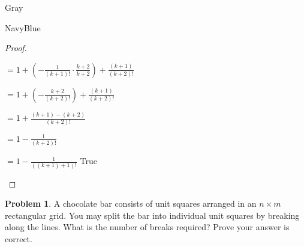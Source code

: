 \documentclass[12pt]{amsart}
\newcounter{problem_number}[section]
\theoremstyle{named}
\newenvironment{prf}
{\medskip\begin{color}{Gray}\begin{framed}\begin{color}{NavyBlue}\begin{proof}[Proof]
\doublespacing}
{\end{proof}\end{color}\end{framed}\end{color}\medskip}
\theoremstyle{definition}
\newtheorem{problem}[proposition]{Problem}
\begin{document}
\begin{prf}
\begin{adjustwidth}{2em}{0em}
		\vspace*{0.5em}

		\hspace*{8.105em}$\displaystyle = 1 + (- \frac{1}{(k+1)!} \cdot \frac{k+2}{k+2}) +\frac{(k+1)}{(k+2)!}$

		\vspace*{0.5em}

		\hspace*{8.105em}$\displaystyle = 1 + (- \frac{k+2}{(k+2)!}) +\frac{(k+1)}{(k+2)!}$

		\vspace*{0.5em}

		\hspace*{8.105em}$\displaystyle = 1 + \frac{(k+1) - (k+2)}{(k+2)!}$

		\vspace*{0.5em}

		\hspace*{8.105em}$\displaystyle = 1 - \frac{1}{(k+2)!}$

		\vspace*{0.5em}

		\hspace*{8.105em}$\displaystyle = 1 - \frac{1}{((k+1)+1)!}$ \hspace*{1em}\checkmark True
	\end{adjustwidth}
\end{prf}

\begin{problem}
	A chocolate bar consists of unit squares arranged in an $n\times m$ rectangular grid.
	You may split the bar into individual unit squares by breaking along the lines. What is the number of breaks required?
	Prove your answer is correct.
\end{problem}
\end{document}

